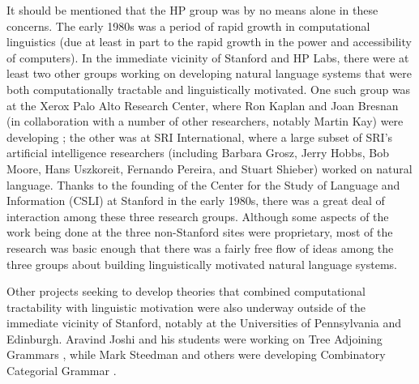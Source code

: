 \documentclass[output=paper]{langsci/langscibook}
\begin{document}
It should be mentioned that the HP group was by no means alone in these concerns.  The early 1980s was a period of rapid growth in computational linguistics (due at least in part to the rapid growth in the power and accessibility of computers).  In the immediate vicinity of Stanford and HP Labs, there were at least two other groups working on developing natural language systems that were both computationally tractable and linguistically motivated.  One such group was at the Xerox Palo Alto Research Center, where Ron Kaplan and Joan Bresnan (in collaboration with a number of other researchers, notably Martin Kay) were developing ; the other was at SRI International, where a large subset of SRI's artificial intelligence researchers  (including Barbara Grosz, Jerry Hobbs, Bob Moore, Hans Uszkoreit, Fernando Pereira, and Stuart Shieber) worked on natural language.  Thanks to the founding of the Center for the Study of Language and Information (CSLI) at Stanford in the early 1980s, there was a great deal of interaction among these three research groups.  Although some aspects of the work being done at the three non-Stanford sites were proprietary, most of the research was basic enough that there was a fairly free flow of ideas among the three groups about building linguistically motivated natural language systems.

Other projects seeking to develop theories that combined computational tractability with linguistic motivation were also underway outside of the immediate vicinity of Stanford, notably at the Universities of Pennsylvania and Edinburgh.  Aravind Joshi and his students were working on Tree Adjoining Grammars \citep{JLT75a-u,Joshi87a-u}, while Mark Steedman and others were developing Combinatory Categorial Grammar \citep{Steedman87a-u,Steedman90a-u}.
\end{document}
